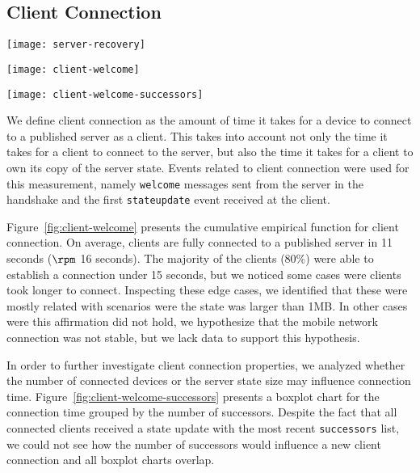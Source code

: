 \subsection{Client Connection}
\label{sub:eval:connection}

\begin{figure*}
        \centering
        \texttt{[image: server-recovery]}
        \caption{Recovery time after a server failure}\label{fig:server-recovery}%
    \endminipage\hfill
        \centering
        \texttt{[image: client-welcome]}
        \caption{Client connection time until receiving a copy of the state}\label{fig:client-welcome}%
    \endminipage\hfill
        \centering
        \texttt{[image: client-welcome-successors]}
        \caption{Client time to connect per number of successors}\label{fig:client-welcome-successors}%
    \endminipage\hfill
\end{figure*}

We define client connection as the amount of time it takes for a device to connect to a published server as a client. 
This takes into account not only the time it takes for a client to connect to the server, but also the time it takes for a client to own its copy of the server state. 
Events related to client connection were used for this measurement, namely \texttt{welcome} messages sent from the server in the handshake and the first \texttt{stateupdate} event received at the client.

Figure~\ref{fig:client-welcome} presents the cumulative empirical function for client connection.
On average, clients are fully connected to a published server in 11 seconds ($\rpm$ 16 seconds). 
The majority of the clients (80\%) were able to establish a connection under 15 seconds, 
but we noticed some cases were clients took longer to connect. 
Inspecting these edge cases, we identified that these were mostly related with scenarios were the state was larger than 1MB. 
In other cases were this affirmation did not hold, we hypothesize that the mobile network connection was not stable, but we lack data to support this hypothesis.

In order to further investigate client connection properties, we analyzed whether the number of connected devices or the server state size may influence connection time.
Figure~\ref{fig:client-welcome-successors} presents a boxplot chart for the connection time grouped by the number of successors. 
Despite the fact that all connected clients received a state update with the most recent \texttt{successors} list, 
we could not see how the number of successors would influence a new client connection and all boxplot charts overlap.

